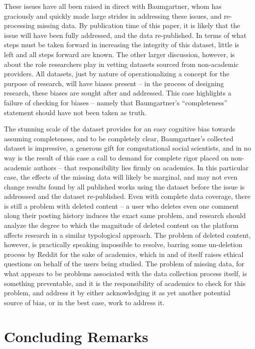 \documentclass[letterpaper,12pt]{article}
\begin{document}
These issues have all been raised in direct with Baumgartner, whom has graciously and quickly made large strides in addressing these issues, and re-processing missing data. By publication time of this paper, it is likely that the issue will have been fully addressed, and the data re-published. In terms of what steps must be taken forward in increasing the integrity of this dataset, little is left and all steps forward are known. The other larger discussion, however, is about the role researchers play in vetting datasets sourced from non-academic providers. All datasets, just by nature of operationalizing a concept for the purpose of research, will have biases present -- in the process of designing research, these biases are sought after and addressed. This case highlights a failure of checking for biases -- namely that Baumgartner's ``completeness'' statement should have not been taken as truth. 

The stunning scale of the dataset provides for an easy cognitive bias towards assuming completeness, and to be completely clear, Baumgartner's collected dataset is impressive, a generous gift for computational social scientists, and in no way is the result of this case a call to demand for complete rigor placed on non-academic authors -- that responsibility lies firmly on academics. In this particular case, the effects of the missing data will likely be marginal, and may not even change results found by all published works using the dataset before the issue is addresssed and the dataset re-published. Even with complete data coverage, there is still a problem with deleted content -- a user who deletes even one comment along their posting history induces the exact same problem, and research should analyze the degree to which the magnitude of deleted content on the platform affects research in a similar typological approach. The problem of deleted content, however, is practically speaking impossible to resolve, barring some un-deletion process by Reddit for the sake of academics, which in and of itself raises ethical questions on behalf of the users being studied. The problem of missing data, for what appears to be problems associated with the data collection process itself, is something preventable, and it is the responsibility of academics to check for this problem, and address it by either acknowledging it as yet another potential source of bias, or in the best case, work to address it.

\section{Concluding Remarks}
\end{document}
